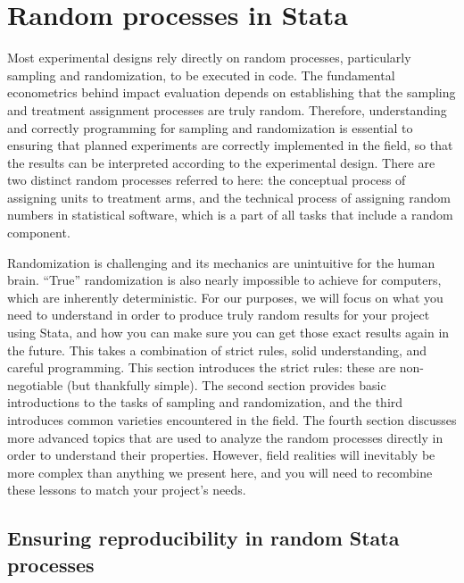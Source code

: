 
\section{Random processes in Stata}

Most experimental designs rely directly on random processes,
particularly sampling and randomization, to be executed in code.
The fundamental econometrics behind impact evaluation
depends on establishing that the sampling
and treatment assignment processes are truly random.
Therefore, understanding and correctly programming for sampling and randomization
is essential to ensuring that planned experiments
are correctly implemented in the field, so that the results
can be interpreted according to the experimental design.
There are two distinct random processes referred to here:
the conceptual process of assigning units to treatment arms,
and the technical process of assigning random numbers in statistical software,
which is a part of all tasks that include a random component.

Randomization is challenging and its mechanics are unintuitive for the human brain.
``True'' randomization is also nearly impossible to achieve for computers,
which are inherently deterministic.
For our purposes, we will focus on what you need to understand
in order to produce truly random results for your project using Stata,
and how you can make sure you can get those exact results again in the future.
This takes a combination of strict rules, solid understanding, and careful programming.
This section introduces the strict rules: these are non-negotiable (but thankfully simple).
The second section provides basic introductions to the tasks of sampling and randomization,
and the third introduces common varieties encountered in the field.
The fourth section discusses more advanced topics that are used
to analyze the random processes directly in order to understand their properties.
However, field realities will inevitably
be more complex than anything we present here,
and you will need to recombine these lessons to match your project's needs.

\subsection{Ensuring reproducibility in random Stata processes}

